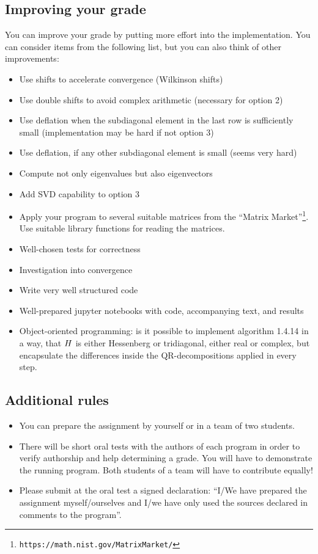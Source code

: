 \documentclass[a4paper]{article}
\begin{document}
\subsection*{Improving your grade}
You can improve your grade by putting more effort into the
implementation. You can consider items from the following list, but
you can also think of other improvements:
\begin{itemize}
\item Use shifts to accelerate convergence (Wilkinson shifts)
\item Use double shifts to avoid complex arithmetic (necessary for option 2)
\item Use deflation when the subdiagonal element in the last row is
  sufficiently small (implementation may be hard if not option 3)
\item Use deflation, if any other subdiagonal element is small (seems very hard)
\item Compute not only eigenvalues but also eigenvectors
\item Add SVD capability to option 3
\item Apply your program to several suitable matrices from the ``Matrix Market''\footnote{\texttt{https://math.nist.gov/MatrixMarket/}}. Use suitable library functions for reading the matrices.
\item Well-chosen tests for correctness
\item Investigation into convergence
\item Write very well structured code
\item Well-prepared jupyter notebooks with code, accompanying text, and results
\item Object-oriented programming: is it possible to implement
  algorithm 1.4.14 in a way, that $\boldmath H$ is either Hessenberg or
  tridiagonal, either real or complex, but encapsulate the differences
  inside the QR-decompositions applied in every step.
\end{itemize}

\subsection*{Additional rules}
\begin{itemize}
\item You can prepare the assignment by yourself or in a team of two
  students.
\item There will be short oral tests with the authors of each program
  in order to verify authorship and help determining a grade. You will
  have to demonstrate the running program. Both students of a team
  will have to contribute equally!
\item Please submit at the oral test a signed declaration: ``I/We have
  prepared the assignment myself/ourselves and I/we have only used the
  sources declared in comments to the program''.
\end{itemize}
\end{document}
